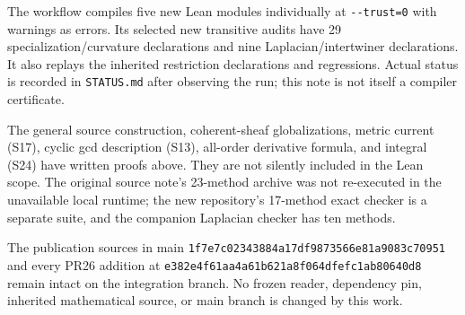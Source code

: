 The workflow compiles five new Lean modules individually at \texttt{-\/-trust=0} with warnings as errors. Its selected new transitive audits have 29 specialization/curvature declarations and nine Laplacian/intertwiner declarations. It also replays the inherited restriction declarations and regressions. Actual status is recorded in \nolinkurl{STATUS.md} after observing the run; this note is not itself a compiler certificate.

The general source construction, coherent-sheaf globalizations, metric current (S17), cyclic gcd description (S13), all-order derivative formula, and integral (S24) have written proofs above. They are not silently included in the Lean scope. The original source note's 23-method archive was not re-executed in the unavailable local runtime; the new repository's 17-method exact checker is a separate suite, and the companion Laplacian checker has ten methods.

The publication sources in main \nolinkurl{1f7e7c02343884a17df9873566e81a9083c70951} and every PR26 addition at \nolinkurl{e382e4f61aa4a61b621a8f064dfefc1ab80640d8} remain intact on the integration branch. No frozen reader, dependency pin, inherited mathematical source, or main branch is changed by this work.
